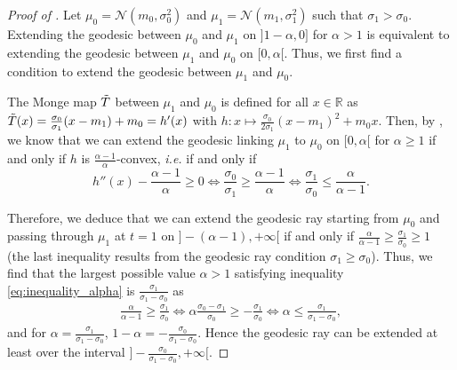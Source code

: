 \documentclass[twoside]{article}
\begin{document}
\begin{proof}[Proof of ]
    Let $\mu_0=\mathcal{N}(m_0,\sigma_0^2)$ and $\mu_1=\mathcal{N}(m_1, \sigma_1^2)$ such that %
    $\sigma_1> \sigma_0$. Extending the geodesic between $\mu_0$ and $\mu_1$ on $]1-\alpha, 0]$ for $\alpha > 1$ is equivalent to extending the geodesic between $\mu_1$ and $\mu_0$ on $[0, \alpha[$. Thus, we first find a condition to extend the geodesic between $\mu_1$ and $\mu_0$.

    The Monge map $\Tilde{T}$ between $\mu_1$ and $\mu_0$ is defined for all $x\in\mathbb{R}$ as $\Tilde{T}(x) = \frac{\sigma_0}{\sigma_1}(x-m_1) + m_0 = h'(x)$ with $h:x\mapsto \frac{\sigma_0}{2\sigma_1}(x-m_1)^2 + m_0 x$.  Then, by \citep[Section 4]{natale2022geodesic}, we know that we can extend the geodesic linking $\mu_1$ to $\mu_0$ on $[0,\alpha[$ for $\alpha\ge 1$ if and only if $h$ is $\frac{\alpha-1}{\alpha}$-convex, \emph{i.e.} if and only if
    \begin{equation} \label{eq:inequality_alpha}
        h''(x) - \frac{\alpha -1}{\alpha} \ge 0 \iff \frac{\sigma_0}{\sigma_1} \ge \frac{\alpha-1}{\alpha} \iff \frac{\sigma_1}{\sigma_0} \le \frac{\alpha}{\alpha-1}.
    \end{equation}

    Therefore, we deduce that we can extend the geodesic ray starting from $\mu_0$ and passing through $\mu_1$ at $t=1$ on $]-(\alpha-1), +\infty[$ if and only if $\frac{\alpha}{\alpha - 1} \ge \frac{\sigma_1}{\sigma_0} \ge 1$ (the last inequality results from the geodesic ray condition $\sigma_1\ge \sigma_0$).
    Thus, we find that the largest possible value $\alpha> 1$ satisfying inequality \eqref{eq:inequality_alpha} is $\frac{\sigma_1}{\sigma_1-\sigma_0}$ as
    \begin{equation}
        \begin{aligned}
            \frac{\alpha}{\alpha -1} \ge \frac{\sigma_1}{\sigma_0} \iff \alpha \frac{\sigma_0-\sigma_1}{\sigma_0} \ge - \frac{\sigma_1}{\sigma_0} \iff \alpha \le \frac{\sigma_1}{\sigma_1-\sigma_0},
        \end{aligned}
    \end{equation}
    and for $\alpha=\frac{\sigma_1}{\sigma_1-\sigma_0}$, %
    $1-\alpha = -\frac{\sigma_0}{\sigma_1-\sigma_0}$. Hence the geodesic ray can be extended at least over the interval $]-\frac{\sigma_0}{\sigma_1-\sigma_0}, +\infty[$.
\end{proof}
\end{document}

